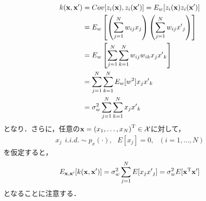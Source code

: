 \documentclass[11pt,a4j]{article}
\begin{document}
        \begin{align}
          k( {\bf x}, {\bf x}' ) 
          &= Cov[z_i({\bf x}), z_i({\bf x}')] = E_w[z_i({\bf x}) z_i({\bf x}')] \\
          &= E_w \left[ \left( \sum_{j=1}^{N} w_{ij} x_j \right) \left( \sum_{j=1}^{N} w_{ij} {x'}_j \right) \right] \\
          &= E_w \left[ \sum_{j=1}^{N} \sum_{k=1}^{N} w_{ij} w_{ik} x_j {x'}_k \right] \\
          &= \sum_{j=1}^{N} \sum_{k=1}^{N} E_w [ w^2 ]  x_j {x'}_k \\
          &= \sigma_w^2 \sum_{j=1}^{N} \sum_{k=1}^{N} x_j {x'}_k \\
        \end{align}
        となり．さらに，任意の${\bf x} = {(x_1, \dots, x_N)}^{\mathrm{T}} \in \mathcal{X}$に対して，
        \begin{align}
          x_j ~~ i.i.d. \sim p_x(\cdot), ~~~ E[x_j] = 0, ~~~ (i=1, \dots, N)
        \end{align}
        を仮定すると，
        \begin{align}
          E_{{\bf x}, {\bf x}'} [ k( {\bf x}, {\bf x}' ) ]
          = \sigma_w^2 \sum_{j=1}^{N} E[x_j {x'}_j]
          = \sigma_w^2 E[ {\bf x}^{\mathrm{T}} {\bf x}' ] 
        \end{align}
        となることに注意する．
\end{document}
